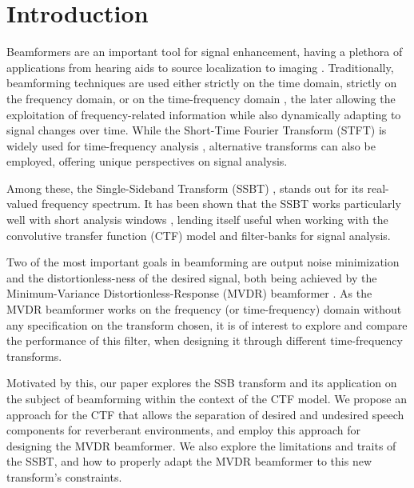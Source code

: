\section{Introduction}
\label{sec:introduction}

Beamformers are an important tool for signal enhancement, having a plethora of applications from hearing aids \cite{lobato_worst-case-optimization_2020} to source localization \cite{chen_source_2002} to imaging \cite{lu_biomedical_1994,nguyen_minimum_2017}. Traditionally, beamforming techniques are used either strictly on the time domain, strictly on the frequency domain, or on the time-frequency domain \cite{benesty_fundamentals_2018}, the later allowing the exploitation of frequency-related information while also dynamically adapting to signal changes over time. While the Short-Time Fourier Transform (STFT) is widely used for time-frequency analysis \cite{kiymik_comparison_2005,pan_microphone_2021}, alternative transforms \cite{chen_wavelet-based_2018,yang_general_2014,almeida_fractional_1994} can also be employed, offering unique perspectives on signal analysis.

Among these, the Single-Sideband Transform (SSBT) \cite{crochiere_multirate_1983,oyzerman_speech_2012}, stands out for its real-valued frequency spectrum. It has been shown that the SSBT works particularly well with short analysis windows \cite{crochiere_multirate_1983}, lending itself useful when working with the convolutive transfer function (CTF) model \cite{talmon_relative_2009} and filter-banks \cite{kumatani_filter_2008,gopinath_tutorial_1993} for signal analysis.

Two of the most important goals in beamforming are output noise minimization and the distortionless-ness of the desired signal, both being achieved by the Minimum-Variance Distortionless-Response (MVDR) beamformer \cite{capon_high-resolution_1969,erdogan_improved_2016}. As the MVDR beamformer works on the frequency (or time-frequency) domain without any specification on the transform chosen, it is of interest to explore and compare the performance of this filter, when designing it through different time-frequency transforms.

Motivated by this, our paper explores the SSB transform and its application on the subject of beamforming within the context of the CTF model. We propose an approach for the CTF that allows the separation of desired and undesired speech components for reverberant environments, and employ this approach for designing the MVDR beamformer. We also explore the limitations and traits of the SSBT, and how to properly adapt the MVDR beamformer to this new transform's constraints.

